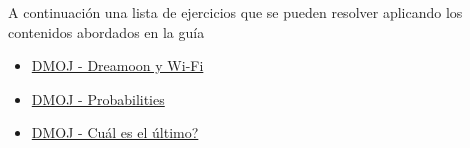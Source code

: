 A  continuación una lista de ejercicios que se pueden resolver aplicando los contenidos abordados en la guía

\begin{itemize}
	\item \href{https://dmoj.uclv.edu.cu/problem/dreamoon}{DMOJ - Dreamoon y Wi-Fi}
	\item \href{https://dmoj.uclv.edu.cu/problem/probabilities}{DMOJ - Probabilities}
	\item \href{https://dmoj.uclv.edu.cu/problem/expectedend}{ DMOJ - Cuál es el último?}
\end{itemize}
